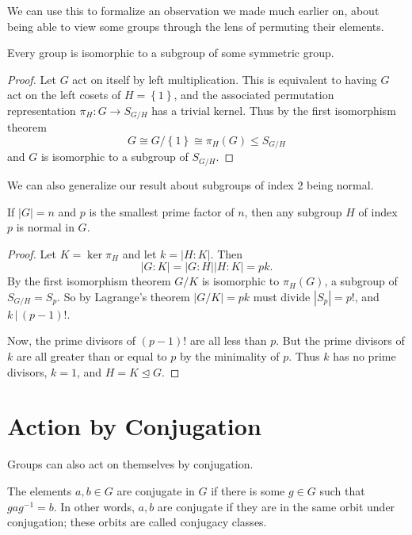 \documentclass[../m171main.tex]{subfiles}
\begin{document}
We can use this to formalize an observation we made much earlier on, about being able to view some groups through the lens of permuting their elements.

\begin{corollary}
    Every group is isomorphic to a subgroup of some symmetric group.
\end{corollary}

\begin{proof}
    Let $G$ act on itself by left multiplication.
    This is equivalent to having $G$ act on the left cosets of $H = \left\{ 1 \right\}$, and the associated permutation representation $\pi_H : G \to S_{G / H}$ has a trivial kernel.
    Thus by the first isomorphism theorem
    \[ G \cong G / \left\{ 1 \right\} \cong \pi_H(G) \leq S_{G / H} \]
    and $G$ is isomorphic to a subgroup of $S_{G / H}$.
\end{proof}

We can also generalize our result about subgroups of index 2 being normal.

\begin{corollary}[]
    If $|G| = n$ and $p$ is the smallest prime factor of $n$, then any subgroup $H$ of index $p$ is normal in $G$.
\end{corollary}

\begin{proof}
    Let $K = \ker \pi_H$ and let $k = |H : K|$.
    Then
    \[ |G : K| = |G : H| |H : K| = pk. \]
    By the first isomorphism theorem $G / K$ is isomorphic to $\pi_H(G)$, a subgroup of $S_{G / H} = S_p$.
    So by Lagrange's theorem $|G / K| = pk$ must divide $|S_p| = p!$, and $k \,|\, (p-1)!$.

    Now, the prime divisors of $(p-1)!$ are all less than $p$.
    But the prime divisors of $k$ are all greater than or equal to $p$ by the minimality of $p$.
    Thus $k$ has no prime divisors, $k = 1$, and $H = K \trianglelefteq G$.
\end{proof}

\section{Action by Conjugation}
Groups can also act on themselves by conjugation.

\begin{definition}
    The elements $a,b \in G$ are conjugate in $G$ if there is some $g \in G$ such that $gag^{-1} = b$.
    In other words, $a,b$ are conjugate if they are in the same orbit under conjugation; these orbits are called conjugacy classes.
\end{definition}
\end{document}
